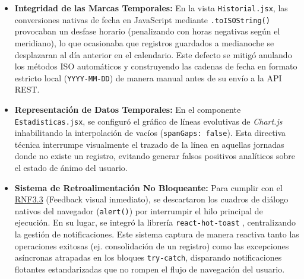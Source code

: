 \begin{itemize}
    \item \textbf{Integridad de las Marcas Temporales:} En la vista \texttt{Historial.jsx}, las conversiones nativas de fecha en JavaScript mediante \texttt{.toISOString()} provocaban un desfase horario (penalizando con horas negativas según el meridiano), lo que ocasionaba que registros guardados a medianoche se desplazaran al día anterior en el calendario. Este defecto se mitigó anulando los métodos ISO automáticos y construyendo las cadenas de fecha en formato estricto local (\texttt{YYYY-MM-DD}) de manera manual antes de su envío a la API REST.
    \item \textbf{Representación de Datos Temporales:} En el componente \texttt{Estadisticas.jsx}, se configuró el gráfico de líneas evolutivas de \textit{Chart.js} inhabilitando la interpolación de vacíos (\texttt{spanGaps: false}). Esta directiva técnica interrumpe visualmente el trazado de la línea en aquellas jornadas donde no existe un registro, evitando generar falsos positivos analíticos sobre el estado de ánimo del usuario.
    \item \textbf{Sistema de Retroalimentación No Bloqueante:} Para cumplir con el \hyperref[tab:rnf_total]{RNF3.3} (Feedback visual inmediato), se descartaron los cuadros de diálogo nativos del navegador (\texttt{alert()}) por interrumpir el hilo principal de ejecución. En su lugar, se integró la librería \texttt{react-hot-toast} \cite{bib:react_hot_toast}, centralizando la gestión de notificaciones. Este sistema captura de manera reactiva tanto las operaciones exitosas (ej. consolidación de un registro) como las excepciones asíncronas atrapadas en los bloques \texttt{try-catch}, disparando notificaciones flotantes estandarizadas que no rompen el flujo de navegación del usuario.
\end{itemize}